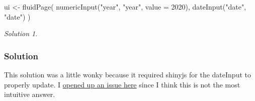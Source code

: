 \documentclass[
]{book}
\newenvironment{Shaded}{\begin{snugshade}}{\end{snugshade}}
\newcommand{\AttributeTok}[1]{\textcolor[rgb]{0.77,0.63,0.00}{#1}}
\newcommand{\ControlFlowTok}[1]{\textcolor[rgb]{0.13,0.29,0.53}{\textbf{#1}}}
\newcommand{\DecValTok}[1]{\textcolor[rgb]{0.00,0.00,0.81}{#1}}
\newcommand{\FunctionTok}[1]{\textcolor[rgb]{0.00,0.00,0.00}{#1}}
\newcommand{\NormalTok}[1]{#1}
\newcommand{\OtherTok}[1]{\textcolor[rgb]{0.56,0.35,0.01}{#1}}
\newcommand{\SpecialCharTok}[1]{\textcolor[rgb]{0.00,0.00,0.00}{#1}}
\newcommand{\StringTok}[1]{\textcolor[rgb]{0.31,0.60,0.02}{#1}}
\theoremstyle{definition}
\theoremstyle{definition}
\theoremstyle{definition}
\theoremstyle{definition}
\theoremstyle{remark}
\newtheorem*{solution}{Solution}
\begin{document}
\begin{Shaded}
\begin{Highlighting}[]
\NormalTok{ui }\OtherTok{\textless{}{-}} \FunctionTok{fluidPage}\NormalTok{(}
  \FunctionTok{numericInput}\NormalTok{(}\StringTok{"year"}\NormalTok{, }\StringTok{"year"}\NormalTok{, }\AttributeTok{value =} \DecValTok{2020}\NormalTok{),}
  \FunctionTok{dateInput}\NormalTok{(}\StringTok{"date"}\NormalTok{, }\StringTok{"date"}\NormalTok{)}
\NormalTok{)}
\end{Highlighting}
\end{Shaded}

\begin{solution}
\leavevmode

\hypertarget{solution-29}{%
\subsubsection*{Solution}\label{solution-29}}

This solution was a little wonky because it required shinyjs for the dateInput to properly update. I \href{https://github.com/rstudio/shiny/issues/2798}{opened up an issue here} since I think this is not the most intuitive answer.

\begin{Shaded}
\end{Shaded}
\end{solution}
\end{document}
